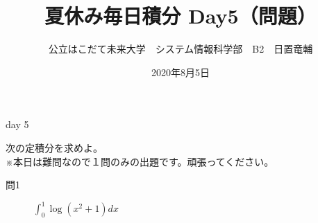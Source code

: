 \documentclass[dvipdfmx,uplatex]{jsarticle}
\title{夏休み毎日積分 Day5（問題）}
\author{公立はこだて未来大学　システム情報科学部　B2　日置竜輔}
\date{2020年8月5日}
\begin{document}
\maketitle

\begin{itembox}[c]{day 5}
    \begin{center}
        次の定積分を求めよ。\\
        ※本日は難問なので１問のみの出題です。頑張ってください。
    \end{center}
\end{itembox}
\begin{description}
    \item [問1] $ \displaystyle \int_0^1 \log(x^2 + 1) dx $
\end{description}
\end{document}
